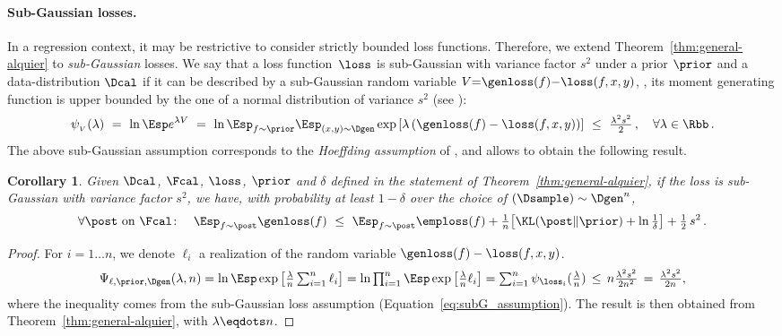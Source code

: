\documentclass{article}
\newtheorem{cor}[thm]{Corollary}
\theoremstyle{definition}
\theoremstyle{plain}
\begin{document}
%
\paragraph{Sub-Gaussian losses.}
%
In a regression context, it may be restrictive to consider strictly bounded loss functions. Therefore, we extend Theorem~\ref{thm:general-alquier} to \emph{sub-Gaussian} losses.
We say that a loss function~$\loss$ is sub-Gaussian with variance factor $s^2$ under a prior $\prior$ and a data-distribution $\Dcal$ if it can be described by a sub-Gaussian random variable $V{=}\genloss(f){-}\loss(f,x,y)$, \ie, its moment generating function is upper bounded by the one of a normal distribution of variance $s^2$ (see \citet[][Section~2.3]{boucheron-13}):
\begin{equation}\label{eq:subG_assumption}
\psi_{_V}(\lambda)
	\ = \ \ln \Esp e^{\lambda V}%
	\ =  \ \ln	\Esp_{f\sim\prior} \Esp_{{(x,y)\sim \Dgen}} 
	\exp\left[{\lambda\left(\genloss(f) - \loss(f, x,y)\right)}\right]
	\ \leq \ {\tfrac{\lambda^2 s^2}{2}}\,
, \quad \forall \lambda  \in \Rbb\,.
%
%
%
\end{equation}
The above sub-Gaussian assumption corresponds to the \emph{Hoeffding assumption} of \citet{alquier-15}, and allows to obtain the following result.
\begin{cor} \label{cor:alquier-subG}
Given $\Dcal$, $\Fcal$,  $\loss$,  $\prior$ and $\delta$ defined in the statement of  Theorem~\ref{thm:general-alquier}, if the loss is sub-Gaussian with variance factor $s^2$, we have,
with probability at least $1{-}\delta$ over the choice of $(\Dsample)\sim \Dgen^n$,
\begin{align*}%
\forall \post \text{ on } \Fcal\colon \quad 
\Esp_{f\sim\post} \genloss(f) 
\ \le \  \Esp_{f\sim\post} \emploss(f) +
\tfrac{1}{n}\!\left[  \KL(\post\|\prior) +
\ln\tfrac{1}{\delta}\right]+\tfrac12\, s^2\,.
\end{align*}
\end{cor}
\begin{proof}
	For  $i = 1\ldots n$, we denote  $\ell_i$ a \iid realization of the random variable 
	$\genloss(f) - \loss(f, x, y) $. 
%
		\begin{align*}\textstyle
	\Psi_{\ell,\prior,\Dgen}(\lambda,n)
		= \ln \Esp \exp \left[ \tfrac\lambda n \sum_{i=1}^n \ell_i\right]%
		= \ln \prod_{i=1}^n \Esp \exp \left[ \tfrac\lambda n\ell_i\right]
		= \sum_{i=1}^n \psi_{\loss_i}(\tfrac{\lambda}{n})
		\, \leq\, n \tfrac{\lambda^2s^2}{2n^2}
		\,=\,   \tfrac{\lambda^2s^2}{2n},
		\end{align*}
%
%
%
%
%
%
%
%
%
%
%
%
%
%
%
%
%
%
	where the inequality comes from the sub-Gaussian loss assumption (Equation~\ref{eq:subG_assumption}).
	The result is then obtained from Theorem~\ref{thm:general-alquier}, with $\lambda\eqdots n$.
%
%
%
%
%
%
%
%
%
%
%
\end{proof}
%
%
%
%
%
%
%
%
%
%
%
%
%
%
%
%
%
%
%
%
\end{document}
